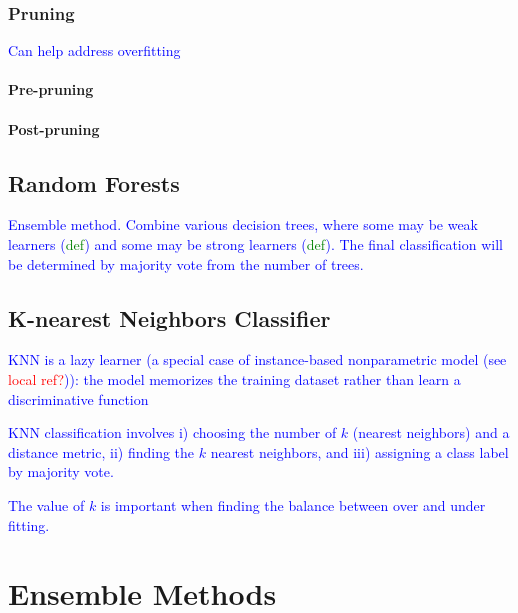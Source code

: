 \subsubsection{Pruning}

\textcolor{blue}{Can help address overfitting}

\paragraph{Pre-pruning}

\paragraph{Post-pruning}

\subsection{Random Forests}

\textcolor{blue}{Ensemble method. Combine various decision trees, where some may be weak learners (\textcolor{green}{def}) and some may be strong learners (\textcolor{green}{def}). The final classification will be determined by majority vote from the number of trees.}


\subsection{K-nearest Neighbors Classifier}

\textcolor{blue}{KNN is a lazy learner (a special case of instance-based nonparametric model (see \textcolor{red}{local ref?})): the model memorizes the training dataset rather than learn a discriminative function}

\textcolor{blue}{KNN classification involves i) choosing the number of $k$ (nearest neighbors) and a distance metric, ii) finding the $k$ nearest neighbors, and iii) assigning a class label by majority vote.}

\textcolor{blue}{The value of $k$ is important when finding the balance between over and under fitting.}



\section{Ensemble Methods}


